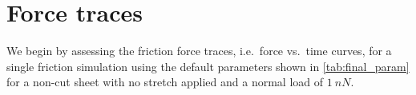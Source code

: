 



















\section{Force traces}\label{sec:single_analysis}
We begin by assessing the friction force traces, i.e.\ force vs.\ time curves, for a single friction simulation using the default parameters shown in \cref{tab:final_param} for a non-cut sheet with
no stretch applied and a normal load of $\SI{1}{nN}$. 


